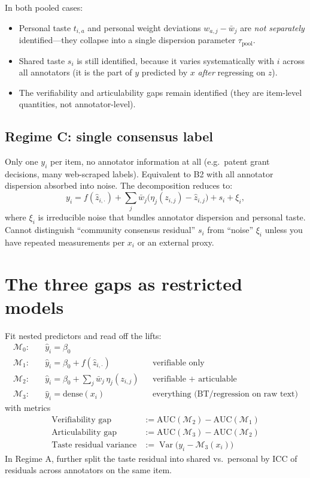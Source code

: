 \documentclass[11pt]{article}
\newcommand{\Var}{\operatorname{Var}}
\begin{document}
In both pooled cases:
\begin{itemize}[topsep=2pt,itemsep=2pt]
  \item Personal taste $t_{i,a}$ and personal weight deviations $w_{a,j}-\bar w_j$ are
        \emph{not separately} identified---they collapse into a single dispersion
        parameter $\tau_{\text{pool}}$.
  \item Shared taste $s_i$ is still identified, because it varies systematically with $i$
        across all annotators (it is the part of $y$ predicted by $x$ \emph{after}
        regressing on $z$).
  \item The verifiability and articulability gaps remain identified (they are item-level
        quantities, not annotator-level).
\end{itemize}

\subsection{Regime C: single consensus label}

Only one $y_i$ per item, no annotator information at all (e.g.\ patent grant decisions,
many web-scraped labels). Equivalent to B2 with all annotator dispersion absorbed into
noise. The decomposition reduces to:
\[
y_i = f(\hat z_{i,\cdot}) + \sum_j \bar w_j\bigl(\eta_j(z_{i,j}) - \hat z_{i,j}\bigr) + s_i + \xi_i,
\]
where $\xi_i$ is irreducible noise that bundles annotator dispersion and personal taste.
Cannot distinguish ``community consensus residual'' $s_i$ from ``noise'' $\xi_i$ unless
you have repeated measurements per $x_i$ or an external proxy.

\section{The three gaps as restricted models}

Fit nested predictors and read off the lifts:
\begin{align}
\mathcal{M}_0:\quad &\hat y_i = \beta_0 \\
\mathcal{M}_1:\quad &\hat y_i = \beta_0 + f(\hat z_{i,\cdot}) && \text{verifiable only}\\
\mathcal{M}_2:\quad &\hat y_i = \beta_0 + \sum_j \bar w_j \,\eta_j(z_{i,j}) && \text{verifiable + articulable}\\
\mathcal{M}_3:\quad &\hat y_i = \text{dense}(x_i) && \text{everything (BT/regression on raw text)}
\end{align}
with metrics
\begin{align}
\text{Verifiability gap} &:= \text{AUC}(\mathcal{M}_2) - \text{AUC}(\mathcal{M}_1) \\
\text{Articulability gap} &:= \text{AUC}(\mathcal{M}_3) - \text{AUC}(\mathcal{M}_2) \\
\text{Taste residual variance} &:= \Var\bigl(y_i - \mathcal{M}_3(x_i)\bigr)
\end{align}
In Regime A, further split the taste residual into shared vs.\ personal by ICC of residuals
across annotators on the same item.
\end{document}
